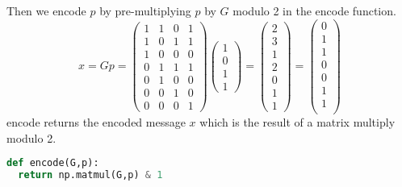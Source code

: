 \documentclass[12pt]{article}
\begin{document}
\noindent Then we encode $p$ by pre-multiplying $p$ by $G$ modulo 2 in the encode function.
\[
  x = Gp = 
  \begin{pmatrix}
    1 & 1 & 0 & 1 \\  
    1 & 0 & 1 & 1 \\ 
    1 & 0 & 0 & 0 \\  
    0 & 1 & 1 & 1 \\ 
    0 & 1 & 0 & 0 \\  
    0 & 0 & 1 & 0 \\  
    0 & 0 & 0 & 1 
  \end{pmatrix}
  \begin{pmatrix}
    1 \\
    0 \\
    1 \\
    1
  \end{pmatrix} 
  =
  \begin{pmatrix}
    2 \\
    3 \\
    1 \\
    2 \\
    0 \\
    1 \\
    1
  \end{pmatrix} 
  = 
  \begin{pmatrix}
    0 \\
    1 \\
    1 \\
    0 \\
    0 \\
    1 \\
    1 \\
  \end{pmatrix} 
\]
encode returns the encoded message $x$ which is the result of a matrix multiply modulo 2.
\begin{lstlisting}[frame=single,language=Python,caption=encode \label{code:makeMessage}]
def encode(G,p):
  return np.matmul(G,p) & 1
\end{lstlisting}
\end{document}
